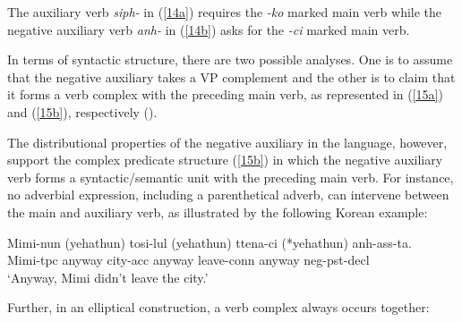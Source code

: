 \documentclass[output=paper]{langsci/langscibook}
\begin{document}
The auxiliary verb {\it siph-} in (\ref{14a}) requires the
{\it -ko} marked main verb while the negative auxiliary
 verb {\it anh-} in (\ref{14b}) asks for the {\it -ci} marked main verb.




In terms of syntactic structure, there
are two possible analyses.  One is to assume that the negative auxiliary
takes
a VP complement and the other is to claim that it forms a verb complex
with the preceding main verb, as
represented in (\ref{15a}) and (\ref{15b}), respectively (\citep{Kim:16}).

\begin{exe}
\ex \begin{xlist}
\ex \label{15a}

\ex \label{15b}
\end{xlist} \end{exe}


\noindent The distributional properties of
 the negative auxiliary in the language, however, support
 the complex predicate structure (\ref{15b}) in which the negative auxiliary verb
forms a syntactic/semantic unit with the preceding main verb.
For instance, no adverbial expression, including
a parenthetical adverb, can intervene between
the main and auxiliary verb, as illustrated by the
following Korean example:

\begin{exe}
\ex \gll Mimi-nun (yehathun) tosi-lul (yehathun) ttena-ci (*yehathun) anh-ass-ta. \\
Mimi-{\sc tpc} anyway city-{\sc acc} anyway leave-{\sc conn} anyway {\sc neg}-{\sc pst}-{\sc decl} \\
`Anyway, Mimi didn't leave the city.'
\end{exe}
%
Further, in an elliptical construction, a verb
complex always occurs together:
\end{document}
